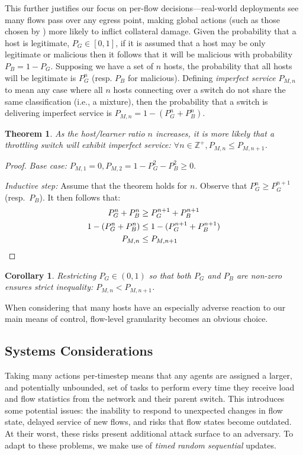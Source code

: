 \documentclass[10pt, times, conference, letterpaper]{IEEEtran}
\newtheorem{thm}{Theorem}
\newtheorem{corr}{Corollary}[thm]
\begin{document}
This further justifies our focus on per-flow decisions---real-world deployments see many flows pass over any egress point, making global actions (such as those chosen by \textcite{DBLP:journals/eaai/MalialisK15}) more likely to inflict collateral damage.
Given the probability that a host is legitimate, $P_G \in [0,1]$,  if it is assumed that a host may be only legitimate or malicious then it follows that it will be malicious with probability $P_B = 1 - P_G$.
Supposing we have a set of $n$ hosts, the probability that all hosts will be legitimate is $P_G^n$ (resp. $P_B$ for malicious).
Defining \emph{imperfect service} $P_{M,n}$ to mean any case where all $n$ hosts connecting over a switch do not share the same classification (i.e., a mixture), then the probability that a switch is delivering imperfect service is $P_{M,n} = 1 - (P_G^n + P_B^n)$.
\begin{thm}
	As the host/learner ratio $n$ increases, it is more likely that a throttling switch will exhibit imperfect service: $\forall n \in \mathbb{Z}^{+}, P_{M,n} \le P_{M,n+1}$.
\end{thm}
\begin{proof}
	\emph{Base case:} $P_{M,1}=0, P_{M,2} = 1 - P_G^2 - P_B^2 \ge 0$.
	
	\emph{Inductive step:} Assume that the theorem holds for $n$. Observe that $P_G^n \ge P_G^{n+1}$ (resp.\ $P_B$). It then follows that:
	\begin{align*}
	P_G^n + P_B^n &\ge P_G^{n+1} + P_B^{n+1}\\
	1 - (P_G^n + P_B^n) &\le 1 - (P_G^{n+1} + P_B^{n+1})\\
	P_{M,n} &\le P_{M,n+1} \qedhere
	\end{align*}
\end{proof}
\begin{corr}
	Restricting $P_G \in (0,1)$ so that both $P_G$ and $P_B$ are non-zero ensures strict inequality: $P_{M,n} < P_{M,n+1}$.
\end{corr}
When considering that many hosts have an especially adverse reaction to our main means of control, flow-level granularity becomes an obvious choice.

\subsection{Systems Considerations}\label{sec:systems-considerations}
Taking many actions per-timestep means that any agents are assigned a larger, and potentially unbounded, set of tasks to perform every time they receive load and flow statistics from the network and their parent switch.
This introduces some potential issues: the inability to respond to unexpected changes in flow state, delayed service of new flows, and risks that flow states become outdated.
At their worst, these risks present additional attack surface to an adversary.
To adapt to these problems, we make use of \emph{timed random sequential} updates.
\end{document}

